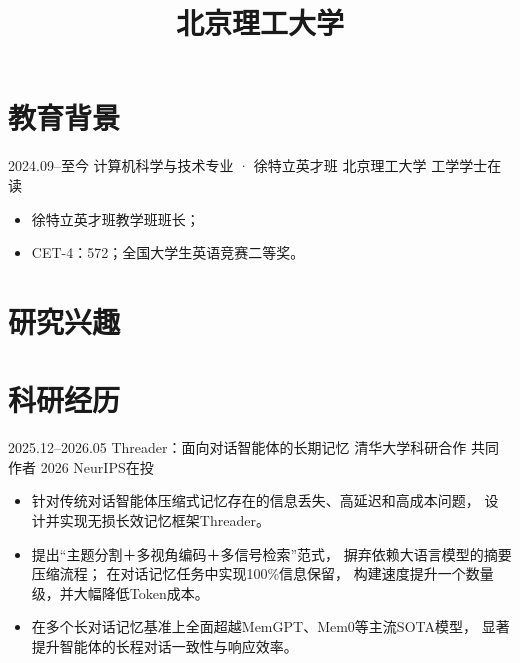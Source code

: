 \documentclass[10pt,a4paper,sans]{moderncv}
\title{北京理工大学}
\begin{document}
\makecvtitle
\vspace{-1.2em}


\section{教育背景}

\cventry
  {2024.09--至今}
  {计算机科学与技术专业 · 徐特立英才班}
  {北京理工大学}
  {工学学士在读}
  {}
  {
    \begin{itemize}
      \item 徐特立英才班教学班班长；
      \item CET-4：572；全国大学生英语竞赛二等奖。
    \end{itemize}
  }


\section{研究兴趣}



\section{科研经历}

\cventry
  {2025.12--2026.05}
  {Threader：面向对话智能体的长期记忆}
  {清华大学科研合作}
  {共同作者}
  {2026 NeurIPS在投}
  {
    \begin{itemize}
      \item 针对传统对话智能体压缩式记忆存在的信息丢失、高延迟和高成本问题，
      设计并实现无损长效记忆框架Threader。
      \item 提出“主题分割＋多视角编码＋多信号检索”范式，
      摒弃依赖大语言模型的摘要压缩流程；
      在对话记忆任务中实现100\%信息保留，
      构建速度提升一个数量级，并大幅降低Token成本。
      \item 在多个长对话记忆基准上全面超越MemGPT、Mem0等主流SOTA模型，
      显著提升智能体的长程对话一致性与响应效率。
    \end{itemize}
  }
\end{document}
